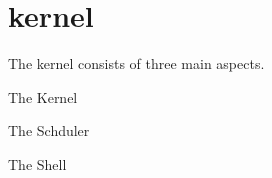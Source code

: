 \chapter{kernel}
\hypertarget{md_doc_2kernel}{}\label{md_doc_2kernel}
The kernel consists of three main aspects.
\begin{DoxyEnumerate}
\item The Kernel
\item The Schduler
\item The Shell 
\end{DoxyEnumerate}